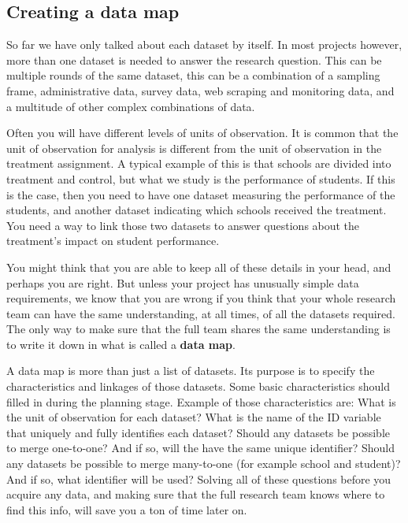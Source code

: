 \subsection{Creating a data map}

So far we have only talked about each dataset by itself.
In most projects however, more than one dataset is needed to answer the research question.
This can be multiple rounds of the same dataset,
this can be a combination of a sampling frame, administrative data,
survey data, web scraping and monitoring data,
and a multitude of other complex combinations of data.

Often you will have different levels of units of observation.
It is common that the unit of observation for analysis
is different from the unit of observation in the treatment assignment.
A typical example of this is that schools are divided into treatment and control,
but what we study is the performance of students.
If this is the case, then you need to have one dataset
measuring the performance of the students,
and another dataset indicating which schools received the treatment.
You need a way to link those two datasets
to answer questions about the treatment's impact on student performance.

You might think that you are able to keep all of these details in your head,
and perhaps you are right.
But unless your project has unusually simple data requirements,
we know that you are wrong if you think
that your whole research team can have the same understanding,
at all times, of all the datasets required.
The only way to make sure that the full team shares the same understanding
is to write it down in what is called a \textbf{data map}.

A data map is more than just a list of datasets.
Its purpose is to specify the characteristics and linkages of those datasets.
Some basic characteristics should filled in during the planning stage.
Example of those characteristics are:
What is the unit of observation for each dataset?
What is the name of the ID variable that uniquely and fully identifies each dataset?
Should any datasets be possible to merge one-to-one?
And if so, will the have the same unique identifier?
Should any datasets be possible to merge many-to-one (for example school and student)?
And if so, what identifier will be used?
Solving all of these questions before you acquire any data,
and making sure that the full research team knows where to find this info,
will save you a ton of time later on.

